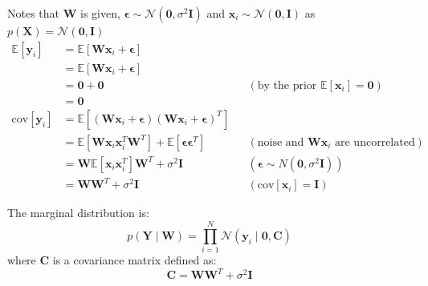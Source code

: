 \documentclass[12pt]{article}
\newenvironment{question}[2][Question]{\begin{trivlist}
\kern10pt
\item[\hskip \labelsep {\bfseries #1}\hskip \labelsep {\bfseries #2.}]}{\end{trivlist}}
\begin{document}
\begin{question}{13}
Notes that $\mathbf{W}$ is given, $\bm{\epsilon} \sim \mathcal{N}(\mathbf{0}, \sigma^2\mathbf{I})$
 and $\mathbf{x}_i \sim \mathcal{N}(\mathbf{0}, \mathbf{I})$ as 
 $p(\mathbf{X}) = \mathcal{N}(\mathbf{0}, \mathbf{I})$
\begin{align*}
  \mathbb{E}[\mathbf{y}_i] &= \mathbb{E}[\mathbf{W}\mathbf{x}_i + \bm{\epsilon}] \\ 
  &= \mathbb{E}[\mathbf{W}\mathbf{x}_i + \bm{\epsilon}] \\
  &= \mathbf{0} + \mathbf{0} 
                      && (\text{by the prior }\mathbb{E}[\mathbf{x}_i] = \mathbf{0})\\
  &= \mathbf{0} \\
  \text{cov}[\mathbf{y}_i] 
  &= \mathbb{E}[(\mathbf{W}\mathbf{x}_i + \bm{\epsilon})
                (\mathbf{W}\mathbf{x}_i + \bm{\epsilon})^{T}] \\
  &= \mathbb{E}[\mathbf{W}\mathbf{x}_i\mathbf{x}_i^T\mathbf{W}^T]
     + \mathbb{E}[\bm{\epsilon}\bm{\epsilon}^{T}]
     && (\text{noise and }\mathbf{W}\mathbf{x}_i\text{ are uncorrelated}) \\
  &= \mathbf{W}\mathbb{E}[\mathbf{x}_i\mathbf{x}_i^T]\mathbf{W}^T + \sigma^2 \mathbf{I}
     && (\bm{\epsilon} \sim N(\mathbf{0}, \sigma^2\mathbf{I})) \\
  &= \mathbf{W}\mathbf{W}^T + \sigma^2\mathbf{I}
     && (\text{cov}[\mathbf{x}_i] = \mathbf{I})
\end{align*}

The marginal distribution is:
\begin{equation}\label{eq:q13-result}
  p(\mathbf{Y}\mid\mathbf{W}) 
  = \prod_{i=1}^{N} 
    \mathcal{N}(\mathbf{y}_i\mid\mathbf{0}, \mathbf{C})
\end{equation}
where $\mathbf{C}$ is a covariance matrix defined as:
\begin{equation}\label{eq:q13-matC}
  \mathbf{C} = \mathbf{W}\mathbf{W}^T + \sigma^2\mathbf{I}
\end{equation}
\end{question}
\end{document}
